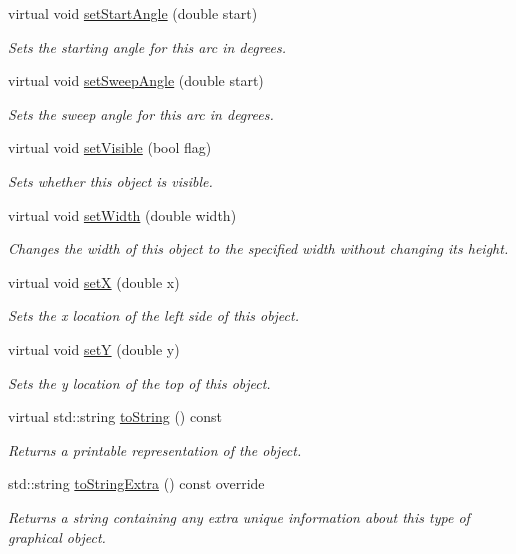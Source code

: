 \begin{DoxyCompactItemize}
virtual void \mbox{\hyperlink{classsgl_1_1GArc_a29b82869001d966bbfc68ad82580a35e}{set\+Start\+Angle}} (double start)
\begin{DoxyCompactList}\small\item\em Sets the starting angle for this arc in degrees. \end{DoxyCompactList}\item 
virtual void \mbox{\hyperlink{classsgl_1_1GArc_a6240a9cb9e5519b2aa4fbcf81ddfc9c8}{set\+Sweep\+Angle}} (double start)
\begin{DoxyCompactList}\small\item\em Sets the sweep angle for this arc in degrees. \end{DoxyCompactList}\item 
virtual void \mbox{\hyperlink{classsgl_1_1GObject_a88203f28224315d9f4471212f4af8ed3}{set\+Visible}} (bool flag)
\begin{DoxyCompactList}\small\item\em Sets whether this object is visible. \end{DoxyCompactList}\item 
virtual void \mbox{\hyperlink{classsgl_1_1GObject_aa3f3fba4cb131baa8696ba01e3bceca1}{set\+Width}} (double width)
\begin{DoxyCompactList}\small\item\em Changes the width of this object to the specified width without changing its height. \end{DoxyCompactList}\item 
virtual void \mbox{\hyperlink{classsgl_1_1GObject_a9c18fcc579333bf9653d13ad2b372e39}{setX}} (double x)
\begin{DoxyCompactList}\small\item\em Sets the x location of the left side of this object. \end{DoxyCompactList}\item 
virtual void \mbox{\hyperlink{classsgl_1_1GObject_a7d57e2a5c35d27feb58fd498a3cf82b9}{setY}} (double y)
\begin{DoxyCompactList}\small\item\em Sets the y location of the top of this object. \end{DoxyCompactList}\item 
virtual std\+::string \mbox{\hyperlink{classsgl_1_1GObject_a1fe5121d6528fdea3f243321b3fa3a49}{to\+String}} () const
\begin{DoxyCompactList}\small\item\em Returns a printable representation of the object. \end{DoxyCompactList}\item 
std\+::string \mbox{\hyperlink{classsgl_1_1GArc_a04364e674911906702b748deec32db18}{to\+String\+Extra}} () const override
\begin{DoxyCompactList}\small\item\em Returns a string containing any extra unique information about this type of graphical object. \end{DoxyCompactList}\end{DoxyCompactItemize}
